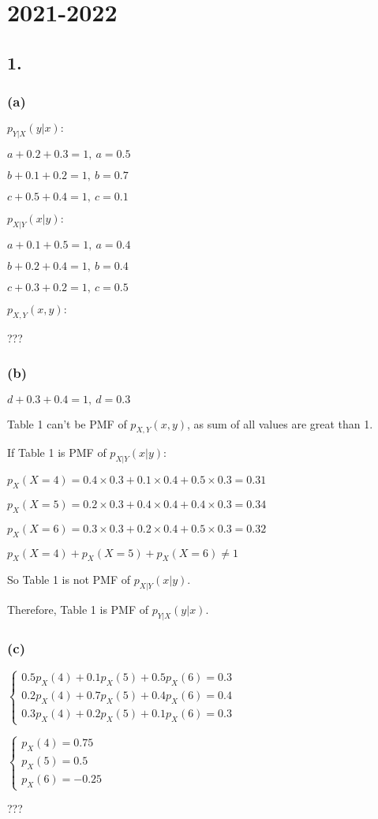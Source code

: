 \documentclass{article}
\begin{document}
\clearpage
\section*{2021-2022}
\subsection*{1.}
\subsubsection*{(a)}
$p_{Y|X}(y|x):$\par
$a+0.2+0.3=1, \ a=0.5$\par
$b+0.1+0.2=1, \ b=0.7$\par
$c+0.5+0.4=1, \ c=0.1$\par
$p_{X|Y}(x|y):$\par
$a+0.1+0.5=1, \ a=0.4$\par
$b+0.2+0.4=1, \ b=0.4$\par
$c+0.3+0.2=1, \ c=0.5$\par
$p_{X,Y}(x,y):$\par
???
\subsubsection*{(b)}
$d+0.3+0.4=1, \ d=0.3$\par
Table 1 can't be PMF of $p_{X,Y}(x,y)$, as sum of all values are great than 1.\par
If Table 1 is PMF of $p_{X|Y}(x|y)$:\par
$p_{X}(X=4)=0.4\times 0.3+0.1\times0.4+0.5\times0.3=0.31$\par 
$p_{X}(X=5)=0.2\times 0.3+0.4\times0.4+0.4\times0.3=0.34$\par 
$p_{X}(X=6)=0.3\times 0.3+0.2\times0.4+0.5\times0.3=0.32$\par 
$p_{X}(X=4)+p_{X}(X=5)+p_{X}(X=6)\neq1$\par
So Table 1 is not PMF of $p_{X|Y}(x|y)$.\par
Therefore, Table 1 is PMF of $p_{Y|X}(y|x)$.
\subsubsection*{(c)}
$\begin{cases}
0.5p_{X}(4)+0.1p_{X}(5)+0.5p_{X}(6)=0.3\\
0.2p_{X}(4)+0.7p_{X}(5)+0.4p_{X}(6)=0.4\\
0.3p_{X}(4)+0.2p_{X}(5)+0.1p_{X}(6)=0.3
\end{cases}$\par\indent
\par
$\begin{cases}
p_{X}(4)=0.75\\
p_{X}(5)=0.5\\
p_{X}(6)=-0.25
\end{cases}$\par
???
\end{document}
